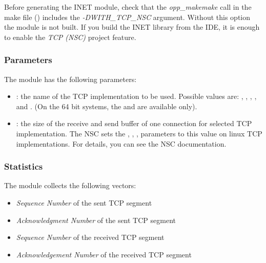 \begin{warning}
Before generating the INET module, check that the \emph{opp\_makemake} call
in the make file () includes the
\emph{-DWITH\_TCP\_NSC} argument. Without this option the 
module is not built. If you build the INET library from the IDE, it is enough
to enable the \emph{TCP (NSC)} project feature.
\end{warning}

\subsubsection*{Parameters}

The  module has the following parameters:

\begin{itemize}
  \item {}: the name of the TCP implementation to be used.
  Possible values are: , ,
  , ,  and
  . (On the 64 bit systems, the  and
   are available only).
  
  \item {}: the size of the receive and send buffer of
  one connection for selected TCP implementation.
  The NSC sets the , , , 
  parameters to this value on linux TCP implementations. For details, you can see
  the NSC documentation.
\end{itemize}

\subsubsection*{Statistics}

The  module collects the following vectors:

\begin{itemize}
  \item {} \emph{Sequence Number} of the sent TCP segment
  \item {} \emph{Acknowledgment Number} of the sent TCP segment
  \item {} \emph{Sequence Number} of the received TCP segment
  \item {} \emph{Acknowledgement Number} of the received TCP segment
\end{itemize}

